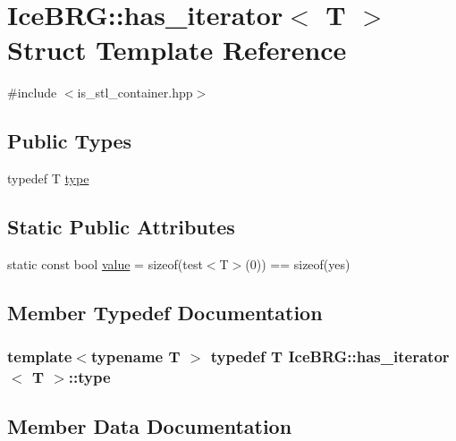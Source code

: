 \hypertarget{structIceBRG_1_1has__iterator}{}\section{Ice\+B\+R\+G\+:\+:has\+\_\+iterator$<$ T $>$ Struct Template Reference}
\label{structIceBRG_1_1has__iterator}


{\ttfamily \#include $<$is\+\_\+stl\+\_\+container.\+hpp$>$}

\subsection*{Public Types}
\begin{DoxyCompactItemize}
\item 
typedef T \hyperlink{structIceBRG_1_1has__iterator_a007a7e16f2b02452a5bc163ef8d876a9}{type}
\end{DoxyCompactItemize}
\subsection*{Static Public Attributes}
\begin{DoxyCompactItemize}
\item 
static const bool \hyperlink{structIceBRG_1_1has__iterator_a36bdd1f7f821776f7a1bb84a6749b2c6}{value} = sizeof(test$<$T$>$(0)) == sizeof(yes)
\end{DoxyCompactItemize}


\subsection{Member Typedef Documentation}
\hypertarget{structIceBRG_1_1has__iterator_a007a7e16f2b02452a5bc163ef8d876a9}{}
\subsubsection[{type}]{\setlength{\rightskip}{0pt plus 5cm}template$<$typename T $>$ typedef T {\bf Ice\+B\+R\+G\+::has\+\_\+iterator}$<$ T $>$\+::{\bf type}}\label{structIceBRG_1_1has__iterator_a007a7e16f2b02452a5bc163ef8d876a9}


\subsection{Member Data Documentation}
\hypertarget{structIceBRG_1_1has__iterator_a36bdd1f7f821776f7a1bb84a6749b2c6}{}
